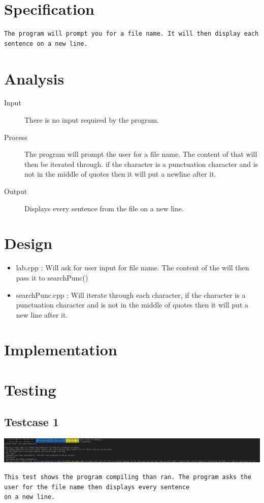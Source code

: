 \documentclass{article}
\begin{document}
\newpage\section*{Specification}
\begin{verbatim}
The program will prompt you for a file name. It will then display each sentence on a new line.
\end{verbatim}


\newpage\section*{Analysis}
\begin{description}
  \item[Input] There is no input required by the program.
  \item[Process] The program will prompt the user for a file name. The content of that will then be iterated through. if the character is a punctuation character and is not in the middle of quotes then it will put a newline after it.
  \item[Output] Displays every sentence from the file on a new line.
\end{description}

\newpage\section*{Design}
\begin{itemize}
	\item lab.cpp : Will ask for user input for file name. The content of the will then pass it to searchPunc()
	\item searchPunc.cpp : Will iterate through each character, if the character is a punctuation character and is not in the middle of quotes then it will put a new line after it.
\end{itemize}

\newpage\section*{Implementation}

\newpage

\newpage

\newpage

\newpage\section*{Testing}
\subsection*{Testcase 1}
\includegraphics[width=450pt]{img/test1.png}
\begin{verbatim}
This test shows the program compiling than ran. The program asks the user for the file name then displays every sentence
on a new line.
\end{verbatim}
\newpage
\end{document}
